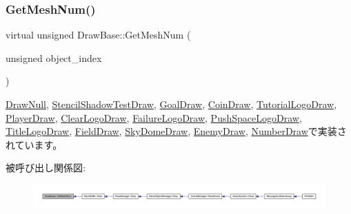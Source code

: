 \subsubsection{\texorpdfstring{Get\+Mesh\+Num()}{GetMeshNum()}}
{\footnotesize\ttfamily virtual unsigned Draw\+Base\+::\+Get\+Mesh\+Num (\begin{DoxyParamCaption}\item[{unsigned}]{object\+\_\+index }\end{DoxyParamCaption})\hspace{0.3cm}{\ttfamily [pure virtual]}}



\mbox{\hyperlink{class_draw_null_ad735978a85a5f3583eecd82d6bfe6413}{Draw\+Null}}, \mbox{\hyperlink{class_stencil_shadow_test_draw_acfa569f1dcdc3829796138e313f204ad}{Stencil\+Shadow\+Test\+Draw}}, \mbox{\hyperlink{class_goal_draw_a7f30c7a4325668eebd8730ad2bea1ad8}{Goal\+Draw}}, \mbox{\hyperlink{class_coin_draw_a178c8d88effe55aaad7d0e45b02e0566}{Coin\+Draw}}, \mbox{\hyperlink{class_tutorial_logo_draw_a19de254c5460e3728d7c79243fd65e6f}{Tutorial\+Logo\+Draw}}, \mbox{\hyperlink{class_player_draw_ad9e2e09a32c7474fcea5e7e24e22bc71}{Player\+Draw}}, \mbox{\hyperlink{class_clear_logo_draw_a99aba47b4693f15498daf7df2bfee2d7}{Clear\+Logo\+Draw}}, \mbox{\hyperlink{class_failure_logo_draw_aa7164b6f5788416788482893aa747d59}{Failure\+Logo\+Draw}}, \mbox{\hyperlink{class_push_space_logo_draw_a9a40fca53e23b9970a7c5decaa3d2da6}{Push\+Space\+Logo\+Draw}}, \mbox{\hyperlink{class_title_logo_draw_a14212f1ee003c40d63db3822a84af7fb}{Title\+Logo\+Draw}}, \mbox{\hyperlink{class_field_draw_aeb54d8cba559ef615ee46c8a7bbd3b9f}{Field\+Draw}}, \mbox{\hyperlink{class_sky_dome_draw_a7ecd8d4b987e4d58a247d3438a45f9d4}{Sky\+Dome\+Draw}}, \mbox{\hyperlink{class_enemy_draw_acda1a2487aea432b08fc816351a12239}{Enemy\+Draw}}, \mbox{\hyperlink{class_number_draw_a8234fb06d885feaa8a2f0ecf256db9a0}{Number\+Draw}}で実装されています。

被呼び出し関係図\+:
\nopagebreak
\begin{figure}[H]
\begin{center}
\leavevmode
\includegraphics[width=350pt]{class_draw_base_a194eb48924f205d60d4e63c5becdd2fe_icgraph}
\end{center}
\end{figure}
\mbox{\label{class_draw_base_a87bb54e7f422959e84ac00aa7631bd3b}} 
